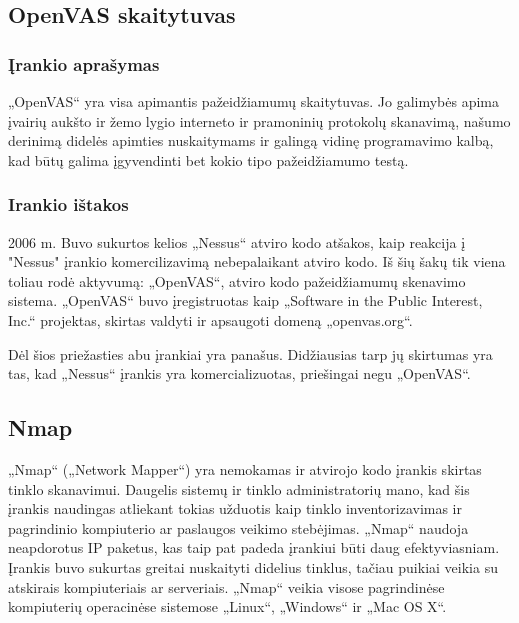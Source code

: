 \documentclass[a4paper,12pt,fleqn]{article}
\begin{document}
\subsection{OpenVAS skaitytuvas}
\label{sec:example}

\subsubsection{Įrankio aprašymas}

„OpenVAS“ yra visa apimantis pažeidžiamumų skaitytuvas. Jo galimybės apima įvairių aukšto ir žemo lygio interneto ir pramoninių protokolų skanavimą, našumo derinimą didelės apimties nuskaitymams ir galingą vidinę programavimo kalbą, kad būtų galima įgyvendinti bet kokio tipo pažeidžiamumo testą\cite{inproceedings}.

\subsubsection{Irankio ištakos}


2006 m. Buvo sukurtos kelios „Nessus“ atviro kodo atšakos, kaip reakcija į "Nessus" įrankio komercilizavimą nebepalaikant atviro kodo. Iš šių šakų tik viena toliau rodė aktyvumą: „OpenVAS“, atviro kodo pažeidžiamumų skenavimo sistema. „OpenVAS“ buvo įregistruotas kaip „Software in the Public Interest, Inc.“ projektas, skirtas valdyti ir apsaugoti domeną „openvas.org“.

Dėl šios priežasties abu įrankiai yra panašus. Didžiausias tarp jų skirtumas yra tas, kad „Nessus“ įrankis yra komercializuotas, priešingai negu „OpenVAS“.


\subsection{Nmap}
\label{sec:nmap}

„Nmap“ („Network Mapper“) yra nemokamas ir atvirojo kodo įrankis skirtas tinklo skanavimui. Daugelis sistemų ir tinklo administratorių mano, kad šis įrankis naudingas atliekant tokias užduotis kaip tinklo inventorizavimas ir  pagrindinio kompiuterio ar paslaugos veikimo stebėjimas. „Nmap“ naudoja neapdorotus IP paketus, kas taip pat padeda įrankiui būti daug efektyviasniam. Įrankis buvo sukurtas greitai nuskaityti didelius tinklus, tačiau puikiai veikia su atskirais kompiuteriais ar serveriais. „Nmap“ veikia visose pagrindinėse kompiuterių operacinėse sistemose  „Linux“, „Windows“ ir „Mac OS X“\cite{Orebaugh:2008:NEY:1571843}. 
\end{document}
